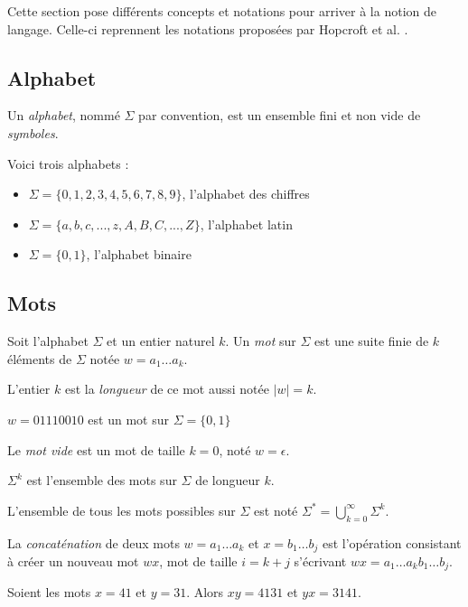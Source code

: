 Cette section pose différents concepts et notations pour arriver à la notion de langage. Celle-ci reprennent les notations proposées par Hopcroft et al. \cite{Hopcroft00}.

\subsection{Alphabet}

Un \emph{alphabet}, nommé $\Sigma$ par convention, est un ensemble fini et non vide de \emph{symboles}.

\begin{exemple} Voici trois alphabets : 
	\begin{itemize}
		\item $\Sigma = \{0,1,2,3,4,5,6,7,8,9\}$, l'alphabet des chiffres
		\item $\Sigma = \{a,b,c,...,z,A,B,C,...,Z\}$, l'alphabet latin
		\item $\Sigma = \{0,1\}$, l'alphabet binaire
	\end{itemize}
\end{exemple}


\subsection{Mots}

Soit l'alphabet $\Sigma$ et un entier naturel $k$. Un \emph{mot} sur $\Sigma$ est une suite finie de $k$ éléments de $\Sigma$ notée $ w = a_1 \dots a_k $.

L'entier $k$ est la \emph{longueur} de ce mot aussi notée $|w|=k$.

\begin{exemple}
	$w=01110010$ est un mot sur $\Sigma=\{0,1\}$
\end{exemple}


Le \emph{mot vide} est un mot de taille $k=0$, noté $w=\epsilon$.

$\Sigma^k$ est l'ensemble des mots sur $\Sigma$ de longueur $k$.
	
L'ensemble de tous les mots possibles sur $\Sigma$ est noté $\Sigma^* = \bigcup_{k=0}^{\infty}\Sigma^k$.

La \emph{concaténation} de deux mots $w=a_1\dots a_k$ et $x=b_1\dots b_j$ est l'opération consistant à créer un nouveau mot $wx$, mot de taille $i=k+j$ s'écrivant $wx=a_1\dots a_kb_1\dots b_j$.

\begin{exemple}
	Soient les mots $x=41$ et $y=31$. Alors $xy=4131$ et $yx=3141$.
\end{exemple}

